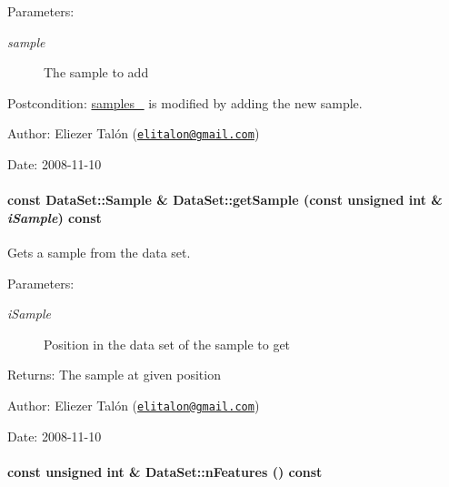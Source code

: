 \begin{Desc}
\item[Parameters:]
\begin{description}
\item[{\em sample}]The sample to add\end{description}
\end{Desc}
\begin{Desc}
\item[Postcondition:]\hyperlink{class_data_set_a7fbe1c9b16c2a001635e153ec1ca326}{samples\_\-} is modified by adding the new sample.\end{Desc}
\begin{Desc}
\item[Author:]Eliezer Talón (\href{mailto:elitalon@gmail.com}{\tt elitalon@gmail.com}) \end{Desc}
\begin{Desc}
\item[Date:]2008-11-10 \end{Desc}
\hypertarget{class_data_set_839eb6985338d2c83ae987e75b2d0357}{
\paragraph[{getSample}]{\setlength{\rightskip}{0pt plus 5cm}const {\bf DataSet::Sample} \& DataSet::getSample (const unsigned int \& {\em iSample}) const}\hfill}
\label{class_data_set_839eb6985338d2c83ae987e75b2d0357}


Gets a sample from the data set. 

\begin{Desc}
\item[Parameters:]
\begin{description}
\item[{\em iSample}]Position in the data set of the sample to get\end{description}
\end{Desc}
\begin{Desc}
\item[Returns:]The sample at given position\end{Desc}
\begin{Desc}
\item[Author:]Eliezer Talón (\href{mailto:elitalon@gmail.com}{\tt elitalon@gmail.com}) \end{Desc}
\begin{Desc}
\item[Date:]2008-11-10 \end{Desc}
\hypertarget{class_data_set_a4249f02ed870b2e76f0e73728229be2}{
\paragraph[{nFeatures}]{\setlength{\rightskip}{0pt plus 5cm}const unsigned int \& DataSet::nFeatures () const}\hfill}
\label{class_data_set_a4249f02ed870b2e76f0e73728229be2}


